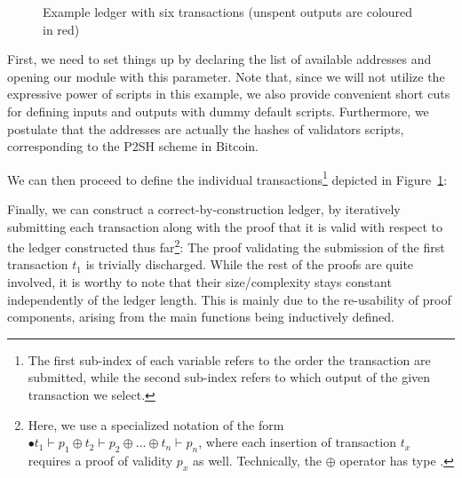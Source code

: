 \documentclass[acmsmall,nonacm=true,screen=true]{acmart}
\begin{document}
\begin{figure}
\caption{Example ledger with six transactions (unspent outputs are coloured in red)}
\label{fig:utxo-ledger}
\end{figure}

First, we need to set things up by declaring the list of available addresses and opening our module with this parameter.
\UTXOexampleSetupA{}
\UTXOexampleSetupB{}
Note that, since we will not utilize the expressive power of scripts in this example, we also provide convenient short cuts for
defining inputs and outputs with dummy default scripts.
Furthermore, we postulate that the addresses are actually the hashes of validators scripts, corresponding to the P2SH scheme
in Bitcoin.

We can then proceed to define the individual transactions\footnote{
The first sub-index of each variable refers to the order the transaction are submitted,
while the second sub-index refers to which output of the given transaction we select.
}
depicted in Figure~\ref{fig:utxo-ledger}:
\UTXOexampleAA{}
\UTXOexampleAB{}

Finally, we can construct a correct-by-construction ledger, by iteratively submitting each transaction along with
the proof that it is valid with respect to the ledger constructed thus far\footnote{
Here, we use a specialized notation of the form $\bullet t_1 \vdash p_1 \oplus t_2 \vdash p_2 \oplus \dots \oplus t_n \vdash p_n$,
where each insertion of transaction $t_x$ requires a proof of validity $p_x$ as well.
Technically, the $\oplus$ operator has type \inlineListCons{}.
}:
\UTXOexampleB{}
The proof validating the submission of the first transaction $t_1$ is trivially discharged.
While the rest of the proofs are quite involved, it is worthy to note that their size/complexity stays constant
independently of the ledger length. This is mainly due to the re-usability of proof components, arising from
the main functions being inductively defined.
\end{document}
